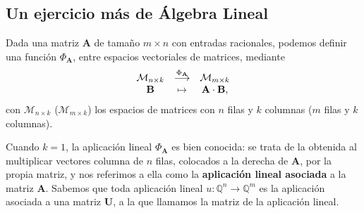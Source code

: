  
\subsection{Un ejercicio m\'as de \'Algebra Lineal}

 Dada una matriz $\mathbf{A}$ de tama\~no $m\times n$ con entradas racionales, 
podemos definir una
funci\'on $\Phi_{\mathbf{A}}$, entre espacios vectoriales de matrices,   
mediante 
  \begin{equation}\notag
   \begin{matrix}
    \mathcal{M}_{n\times
k}&\stackrel{\Phi_{\mathbf{A}}}{\longrightarrow}&\mathcal{M}_{m\times k}\\
    \mathbf{B}&\mapsto&\mathbf{A}\cdot \mathbf{B}, 
   \end{matrix}
\end{equation}
 \noindent con $\mathcal{M}_{n\times k}$ ($\mathcal{M}_{m\times k}$) los
espacios de matrices con $n$ filas y $k$ columnas ($m$ filas y $k$ columnas).
 
 Cuando $k=1$, la aplicaci\'on lineal $\Phi_{\mathbf{A}}$ es bien conocida:  se
trata de la obtenida al multiplicar vectores columna de $n$ filas, colocados a
la derecha de $\mathbf{A}$,  por la propia matriz, y nos referimos a ella como
la {\bf aplicaci\'on lineal asociada} a la matriz $\mathbf{A}$. 
 Sabemos que toda aplicaci\'on lineal $u:\mathbb{Q}^n\to \mathbb{Q}^m$ es la
aplicaci\'on asociada a una matriz $\mathbf{U}$, a la que llamamos {\sc la
matriz} de la aplicaci\'on lineal.
 
